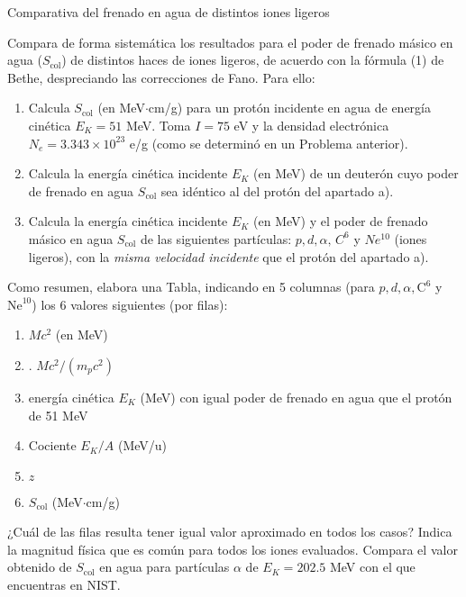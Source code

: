 \begin{Ejercicio}{Comparativa del frenado en agua de distintos iones ligeros}

Compara de forma sistemática los resultados para el poder de frenado másico en agua ($S_{\text{col}}$) de distintos haces de iones ligeros, de acuerdo con la fórmula (1) de Bethe, despreciando las correcciones de Fano. Para ello:  

\begin{enumerate}[label=\alph*)]

\item Calcula $S_{\text{col}}$ (en MeV$\cdot$cm/g) para un protón incidente en agua de energía cinética $E_K = 51$ MeV. Toma $I = 75$ eV y la densidad electrónica $N_e = 3.343 \times 10^{23}$ e/g (como se determinó en un Problema anterior).  

\item  Calcula la energía cinética incidente $E_K$ (en MeV) de un deuterón cuyo poder de frenado en agua $S_{\text{col}}$ sea idéntico al del protón del apartado a).  

\item Calcula la energía cinética incidente $E_K$ (en MeV) y el poder de frenado másico en agua $S_{\text{col}}$ de las siguientes partículas: $p, d, \alpha, \, C^6$ y $Ne^{10}$ (iones ligeros), con la \emph{misma velocidad incidente} que el protón del apartado a).  
\end{enumerate}
Como resumen, elabora una Tabla, indicando en 5 columnas (para $p, d, \alpha, \text{C}^6$ y $\text{Ne}^{10}$) los 6 valores siguientes (por filas):  

\begin{enumerate}
\item $Mc^2$ (en MeV)  
\item. $Mc^2/(m_p c^2)$  
\item energía cinética $E_K$ (MeV) con igual poder de frenado en agua que el protón de 51 MeV  
\item Cociente $E_K/A$ (MeV/u)  
\item $z$  
\item $S_{\text{col}}$ (MeV$\cdot$cm/g)  
\end{enumerate}

¿Cuál de las filas resulta tener igual valor aproximado en todos los casos? Indica la magnitud física que es común para todos los iones evaluados. Compara el valor obtenido de $S_{\text{col}}$ en agua para partículas $\alpha$ de $E_K = 202.5$ MeV con el que encuentras en NIST.

\end{Ejercicio}

